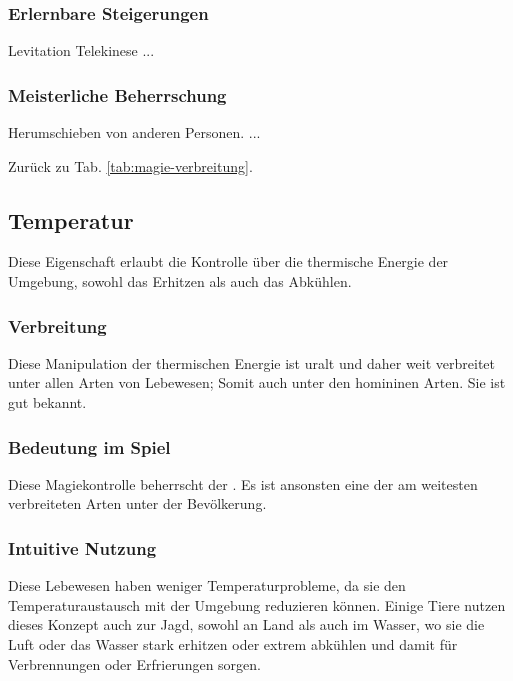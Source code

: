 \subsubsection{Erlernbare Steigerungen}
\begin{outline}
	\1 Levitation
	\1 Telekinese
	\1 ...
\end{outline}

\subsubsection{Meisterliche Beherrschung} 
\begin{outline}
	\1 Herumschieben von anderen Personen.
	\1 ...
\end{outline}
Zurück zu Tab. \ref{tab:magie-verbreitung}.



\subsection{Temperatur}\label{sec:temperaturmagie}
Diese Eigenschaft erlaubt die Kontrolle über die thermische Energie der Umgebung, sowohl das Erhitzen als auch das Abkühlen.

\subsubsection{Verbreitung}
Diese Manipulation der thermischen Energie ist uralt und daher weit verbreitet unter allen Arten von Lebewesen; Somit auch unter den homininen Arten. 
Sie ist gut bekannt.

\subsubsection{Bedeutung im Spiel}
Diese Magiekontrolle beherrscht der . Es ist ansonsten eine der am weitesten verbreiteten Arten unter der Bevölkerung.

\subsubsection{Intuitive Nutzung}
Diese Lebewesen haben weniger Temperaturprobleme, da sie den Temperaturaustausch mit der Umgebung reduzieren können.
Einige Tiere nutzen dieses Konzept auch zur Jagd, sowohl an Land als auch im Wasser, wo sie die Luft oder das Wasser stark erhitzen oder extrem abkühlen und damit für Verbrennungen oder Erfrierungen sorgen.

